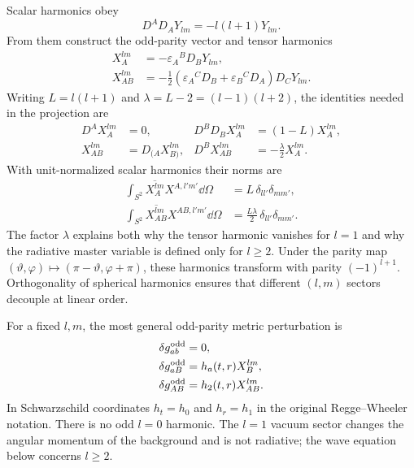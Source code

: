 Scalar harmonics obey
\begin{equation}
  D^AD_AY_{lm}=-l(l+1)Y_{lm} .
  \label{eq:spherical-harmonic-eigenvalue}
\end{equation}
From them construct the odd-parity vector and tensor harmonics
\begin{align}
  X_A^{lm}&=-\varepsilon_A{}^B D_BY_{lm},
  \label{eq:odd-vector-harmonic}\\
  X_{AB}^{lm}
  &=-\frac{1}{2}
  \left(\varepsilon_A{}^C D_B+\varepsilon_B{}^C D_A\right)
  D_CY_{lm} .
  \label{eq:odd-tensor-harmonic}
\end{align}
Writing $L=l(l+1)$ and $\lambda=L-2=(l-1)(l+2)$, the identities needed in
the projection are
\begin{align}
  D^AX_A^{lm}&=0,
  &D^BD_BX_A^{lm}&=(1-L)X_A^{lm},
  \label{eq:odd-vector-identities}\\
  X_{AB}^{lm}&=D_{(A}X_{B)}^{lm},
  &D^BX_{AB}^{lm}&=-\frac{\lambda}{2}X_A^{lm}.
  \label{eq:odd-tensor-identities}
\end{align}
With unit-normalized scalar harmonics their norms are
\begin{align}
  \int_{S^2}\overline{X_A^{lm}}X^{A,l'm'}\dd\Omega
  &=L\,\delta_{ll'}\delta_{mm'},
  \label{eq:odd-vector-norm}\\
  \int_{S^2}\overline{X_{AB}^{lm}}X^{AB,l'm'}\dd\Omega
  &=\frac{L\lambda}{2}\,\delta_{ll'}\delta_{mm'}.
  \label{eq:odd-tensor-norm}
\end{align}
The factor $\lambda$ explains both why the tensor harmonic vanishes for
$l=1$ and why the radiative master variable is defined only for $l\geq2$.
Under the parity map $(\vartheta,\varphi)\mapsto(\pi-\vartheta,
\varphi+\pi)$, these harmonics transform with parity $(-1)^{l+1}$.
Orthogonality of spherical harmonics ensures that different $(l,m)$ sectors
decouple at linear order.

For a fixed $l,m$, the most general odd-parity metric perturbation is
\begin{align}
  \delta g_{ab}^{\mathrm{odd}}&=0,
  \notag\\
  \delta g_{aB}^{\mathrm{odd}}&=h_a(t,r)X_B^{lm},
  \notag\\
  \delta g_{AB}^{\mathrm{odd}}&=h_2(t,r)X_{AB}^{lm} .
  \label{eq:odd-metric-decomposition}
\end{align}
In Schwarzschild coordinates $h_t=h_0$ and $h_r=h_1$ in the original
Regge--Wheeler notation.  There is no odd $l=0$ harmonic.  The $l=1$ vacuum
sector changes the angular momentum of the background and is not radiative;
the wave equation below concerns $l\geq2$.

